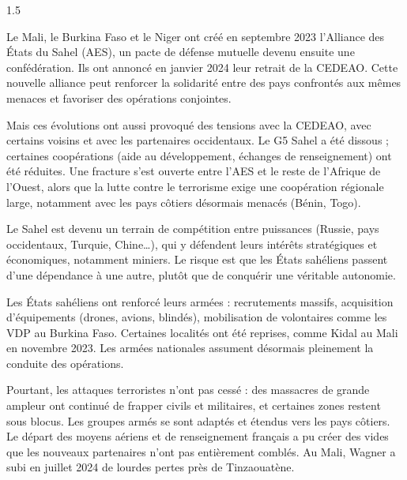 \documentclass[12pt]{article}
\begin{document}
\begin{spacing}{1.5}


Le Mali, le Burkina Faso et le Niger ont créé en septembre 2023 l'Alliance des États du Sahel (AES), un pacte de défense mutuelle devenu ensuite une confédération. Ils ont annoncé en janvier 2024 leur retrait de la CEDEAO. Cette nouvelle alliance peut renforcer la solidarité entre des pays confrontés aux mêmes menaces et favoriser des opérations conjointes.

Mais ces évolutions ont aussi provoqué des tensions avec la CEDEAO, avec certains voisins et avec les partenaires occidentaux. Le G5 Sahel a été dissous ; certaines coopérations (aide au développement, échanges de renseignement) ont été réduites. Une fracture s'est ouverte entre l'AES et le reste de l'Afrique de l'Ouest, alors que la lutte contre le terrorisme exige une coopération régionale large, notamment avec les pays côtiers désormais menacés (Bénin, Togo).

Le Sahel est devenu un terrain de compétition entre puissances (Russie, pays occidentaux, Turquie, Chine\dots), qui y défendent leurs intérêts stratégiques et économiques, notamment miniers. Le risque est que les États sahéliens passent d'une dépendance à une autre, plutôt que de conquérir une véritable autonomie.



Les États sahéliens ont renforcé leurs armées : recrutements massifs, acquisition d'équipements (drones, avions, blindés), mobilisation de volontaires comme les VDP au Burkina Faso. Certaines localités ont été reprises, comme Kidal au Mali en novembre 2023. Les armées nationales assument désormais pleinement la conduite des opérations.

Pourtant, les attaques terroristes n'ont pas cessé : des massacres de grande ampleur ont continué de frapper civils et militaires, et certaines zones restent sous blocus. Les groupes armés se sont adaptés et étendus vers les pays côtiers. Le départ des moyens aériens et de renseignement français a pu créer des vides que les nouveaux partenaires n'ont pas entièrement comblés. Au Mali, Wagner a subi en juillet 2024 de lourdes pertes près de Tinzaouatène.


\end{spacing}
\end{document}
